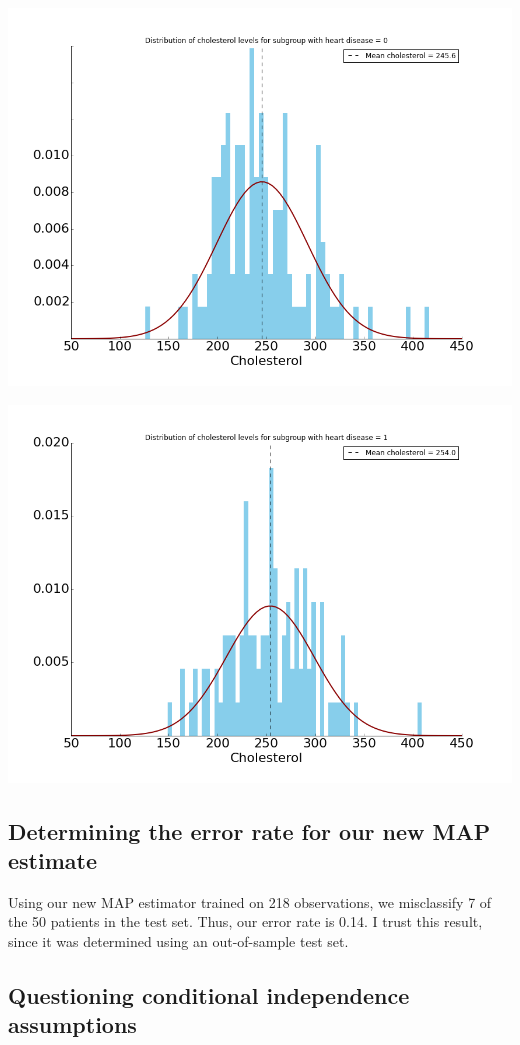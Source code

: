 \documentclass[paper=a4, fontsize=11pt]{scrartcl} %
\numberwithin{equation}{section} %
\numberwithin{figure}{section} %
\numberwithin{table}{section} %
\begin{document}
\includegraphics[scale = 0.5]{distribution_for_HD_0.png}

\includegraphics[scale = 0.5]{distribution_for_HD_1.png}

\subsection{Determining the error rate for our new MAP estimate}

Using our new MAP estimator trained on 218 observations, we misclassify 7 of the 50 patients in the test set. Thus, our error rate is 0.14. I trust this result, since it was determined using an out-of-sample test set.

\subsection{Questioning conditional independence assumptions}
\end{document}
